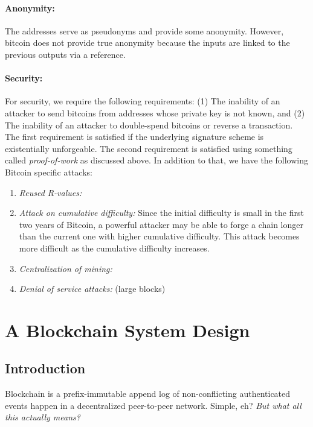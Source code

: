 \documentclass[]{report}   %
\begin{document}
\subsubsection{Anonymity:} 
The addresses serve as pseudonyms and provide some anonymity. However, bitcoin does not provide true anonymity because the inputs are linked to the previous outputs via a reference.

\subsubsection{Security:}

For security, we require the following requirements: (1) The inability of an attacker to send bitcoins from addresses whose private key is not known, and (2) The inability of an attacker to double-spend bitcoins or reverse a transaction. The first requirement is satisfied if the underlying signature scheme is existentially unforgeable. The second requirement is satisfied using something called {\em proof-of-work} as discussed above. In addition to that, we have the following Bitcoin specific attacks:
\begin{enumerate}
	\item {\em Reused R-values:}
	\item {\em Attack on cumulative difficulty:} Since the initial difficulty is small in the first two years of Bitcoin, a powerful attacker may be able to forge a chain longer than the current one with higher cumulative difficulty. This attack becomes more difficult as the cumulative difficulty increases.
	\item {\em Centralization of mining:} 
	\item {\em Denial of service attacks:} (large blocks)
\end{enumerate}


\chapter{A Blockchain System Design}             %
\section{Introduction}     

Blockchain is a prefix-immutable append log of non-conflicting authenticated events happen in a decentralized peer-to-peer network. Simple, eh? \textit{But what all this actually means?}
\end{document}
